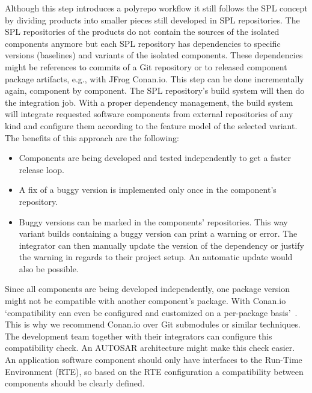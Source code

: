 Although this step introduces a polyrepo workflow it still follows the SPL
concept by dividing products into smaller pieces still developed in SPL
repositories. The SPL repositories of the products do not contain the sources of
the isolated components anymore but each SPL repository has dependencies to
specific versions (baselines) and variants of the isolated components. These
dependencies might be references to commits of a Git repository or to released
component package artifacts, e.g., with JFrog Conan.io. This step can be done
incrementally again, component by component. The SPL repository's build system
will then do the integration job. With a proper dependency management, the build
system will integrate requested software components from external repositories
of any kind and configure them according to the feature model of the selected
variant. The benefits of this approach are the following:
\begin{itemize}
  \item Components are being developed and tested independently to get a faster
        release loop.
  \item A fix of a buggy version is implemented only once in the component's
        repository.
  \item Buggy versions can be marked in the components' repositories. This way
        variant builds containing a buggy version can print a warning or error.
        The integrator can then manually update the version of the dependency or
        justify the warning in regards to their project setup. An automatic
        update would also be possible.
\end{itemize}
Since all components are being developed independently, one package version
might not be compatible with another component's package. With Conan.io
`compatibility can even be configured and customized on a per-package
basis'~\cite{conandocs}. This is why we recommend Conan.io over Git submodules
or similar techniques. The development team together with their integrators can
configure this compatibility check. An AUTOSAR architecture might make this
check easier. An application software component should only have interfaces to
the Run-Time Environment (RTE), so based on the RTE configuration a
compatibility between components should be clearly defined.

